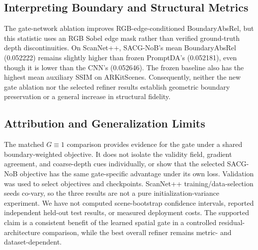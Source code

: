 \subsection{Interpreting Boundary and Structural Metrics}
The gate-network ablation improves RGB-edge-conditioned BoundaryAbsRel, but this statistic uses an RGB Sobel edge mask rather than verified ground-truth depth discontinuities. On ScanNet++, SACG-NoB's mean BoundaryAbsRel (0.052222) remains slightly higher than frozen PromptDA's (0.052181), even though it is lower than the CNN's (0.052646). The frozen baseline also has the highest mean auxiliary SSIM on ARKitScenes. Consequently, neither the new gate ablation nor the selected refiner results establish geometric boundary preservation or a general increase in structural fidelity.

\subsection{Attribution and Generalization Limits}
The matched $G\equiv1$ comparison provides evidence for the gate under a shared boundary-weighted objective. It does not isolate the validity field, gradient agreement, and coarse-depth cues individually, or show that the selected SACG-NoB objective has the same gate-specific advantage under its own loss. Validation was used to select objectives and checkpoints. ScanNet++ training/data-selection seeds co-vary, so the three results are not a pure initialization-variance experiment. We have not computed scene-bootstrap confidence intervals, reported independent held-out test results, or measured deployment costs. The supported claim is a consistent benefit of the learned spatial gate in a controlled residual-architecture comparison, while the best overall refiner remains metric- and dataset-dependent.
